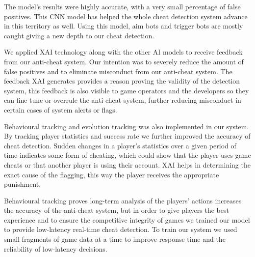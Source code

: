 The model's results were highly accurate, with a very small percentage of false positives. This CNN model has helped the whole cheat detection system advance in this territory as well. Using this model, aim bots and trigger bots are mostly caught giving a new depth to our cheat detection.

We applied XAI technology along with the other AI models to receive feedback from our anti-cheat system. Our intention was to severely reduce the amount of false positives and to eliminate misconduct from our anti-cheat system. The feedback XAI generates provides a reason proving the validity of the detection system, this feedback is also visible to game operators and the developers so they can fine-tune or overrule the anti-cheat system, further reducing misconduct in certain cases of system alerts or flags.

Behavioural tracking and evolution tracking was also implemented in our system. By tracking player statistics and success rate we further improved the accuracy of cheat detection. Sudden changes in a player’s statistics over a given period of time indicates some form of cheating, which could show that the player uses game cheats or that another player is using their account. XAI helps in determining the exact cause of the flagging, this way the player receives the appropriate punishment. 

Behavioural tracking proves long-term analysis of the players’ actions increases the accuracy of the anti-cheat system, but in order to give players the best experience and to ensure the competitive integrity of games we trained our model to provide low-latency real-time cheat detection. To train our system we used small fragments of game data at a time to improve response time and the reliability of low-latency decisions.